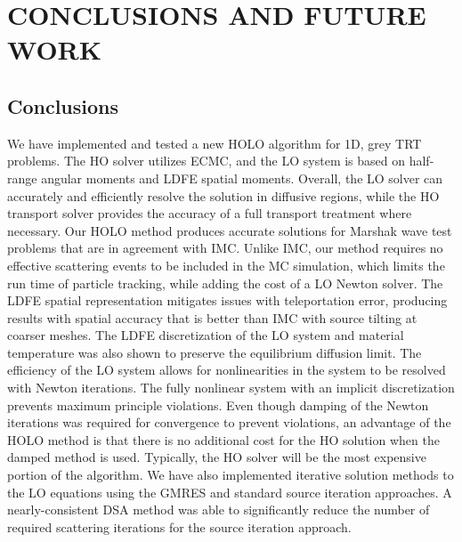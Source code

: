 \chapter{ \uppercase{Conclusions and Future Work} }
\label{chp:conclusions}

\section{Conclusions}

We have implemented and tested a new HOLO algorithm for 1D, grey TRT problems.  The HO
solver utilizes ECMC, and the LO system is based on half-range angular moments and LDFE
spatial moments. Overall, the LO solver can accurately and efficiently resolve the solution in diffusive regions, while the HO
transport solver provides the accuracy of a full transport treatment where necessary. 
Our HOLO method produces accurate solutions for Marshak wave test
problems that are in agreement with IMC.  Unlike IMC, our method requires no effective
scattering events to be included in the MC simulation, which limits the run time of
particle tracking, while adding the cost of a LO Newton solver. The LDFE spatial
representation mitigates issues with teleportation error, producing results with spatial
accuracy that is better than IMC with source tilting at coarser meshes.  The LDFE discretization of the LO system
and material temperature was also shown to preserve the equilibrium diffusion limit.  
The efficiency of the LO system allows for nonlinearities in the system to be resolved
with Newton iterations.  The fully nonlinear system with an implicit discretization
prevents maximum principle violations. Even though damping of the Newton iterations was
required for convergence to prevent violations, an advantage of the HOLO method is that
there is no additional cost for the HO solution when the damped method is used.
Typically, the HO solver will be the most expensive portion of the algorithm. 
We have also implemented iterative solution methods to the LO equations using the GMRES and
standard source iteration approaches.  A nearly-consistent DSA method was able to
significantly reduce the number of required scattering iterations for the source iteration
approach. 

